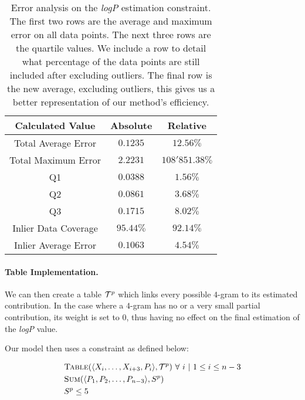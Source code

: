 \documentclass[../Document.tex]{subfiles}
\begin{document}
\begin{table}[H]
    \centering
    \begin{tabular}{|c|c|c|}
        \hline
        Calculated Value & Absolute & Relative\\
        \hline
        Total Average Error & $0.1235$ & $12.56\%$\\
        \hline
        Total Maximum Error & $2.2231$ & $108'851.38\%$\\
        \hline
        Q1 & $0.0388$ & $1.56\%$\\
        \hline
        Q2 & $0.0861$ & $3.68\%$\\
        \hline
        Q3 & $0.1715$ & $8.02\%$\\
        \hline
        Inlier Data Coverage & $95.44\%$ & $92.14\%$\\
        \hline
        Inlier Average Error & $0.1063$ & $4.54\%$\\
        \hline
    \end{tabular}
    \caption[Error analysis on the \emph{logP} estimation constraint]{Error analysis on the \emph{logP} estimation constraint. The first two rows are the average and maximum error on all data points. The next three rows are the quartile values. We include a row to detail what percentage of the data points are still included after excluding outliers. The final row is the new average, excluding outliers, this gives us a better representation of our method's efficiency.}
    \label{tab:lingo-error-analysis}
\end{table}

\paragraph{Table Implementation.}
We can then create a table ${\cal T}^p$ which links every possible $4$-gram to its estimated contribution.
In the case where a $4$-gram has no or a very small partial contribution, its weight is set to 0, thus having no effect on the final estimation of the \emph{logP} value.

Our model then uses a \extensional constraint as defined below:

\begin{align*}
    &\mbox{\sc Table}(\langle X_i,\ldots,X_{i+3},P_i\rangle, {\cal T}^p)\ \forall\ i\ \vert\ 1 \leq i \leq n-3 \\
    &\mbox{\sc Sum}(\langle P_1, P_2,\ldots,P_{n-3} \rangle, S^p)\\
    &S^p \leq 5
\end{align*}
\end{document}
